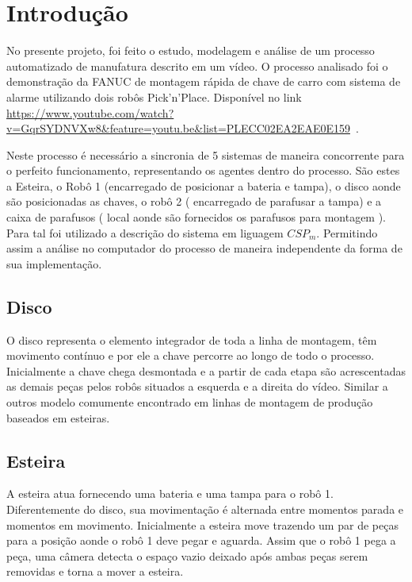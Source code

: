 \documentclass[a4paper,11pt,twocolumns]{article}
\title{\tituloRelatorio}
\begin{document}


\section{Introdução}
No presente projeto, foi feito o estudo, modelagem e análise de um processo automatizado de manufatura descrito em um vídeo. O processo analisado foi o demonstração da FANUC de montagem rápida de chave de carro com sistema de alarme utilizando dois robôs Pick'n'Place. Disponível no link \url{https://www.youtube.com/watch?v=GqrSYDNVXw8&feature=youtu.be&list=PLECC02EA2EAE0E159}\ .

 Neste processo é necessário a sincronia de 5 sistemas de maneira concorrente para o perfeito funcionamento, representando os agentes dentro do processo. São estes a Esteira, o Robô 1 (encarregado de posicionar a bateria e tampa), o disco aonde são posicionadas as chaves, o robô 2 ( encarregado de parafusar a tampa) e a caixa de parafusos ( local aonde são fornecidos os parafusos para montagem ). Para tal foi utilizado a descrição do sistema em liguagem $CSP_m$. Permitindo assim a análise no computador do processo de maneira independente da forma de sua implementação.

\subsection{Disco}
O disco representa o elemento integrador de toda a linha de montagem, têm movimento contínuo e por ele a chave percorre ao longo de todo o processo. Inicialmente a chave chega desmontada e a partir de cada etapa são acrescentadas as demais peças pelos robôs situados a esquerda e a direita do vídeo. Similar a outros modelo comumente encontrado em linhas de montagem de produção baseados em esteiras.

\subsection{Esteira}
A esteira atua fornecendo uma bateria e uma tampa para o robô 1. Diferentemente do disco, sua movimentação é alternada entre momentos parada e momentos em movimento. Inicialmente a esteira move trazendo um par de peças para a posição aonde o robô 1 deve pegar e aguarda. Assim que o robô 1 pega a peça, uma câmera detecta o espaço vazio deixado após ambas peças serem removidas e torna a mover a esteira.
\end{document}
